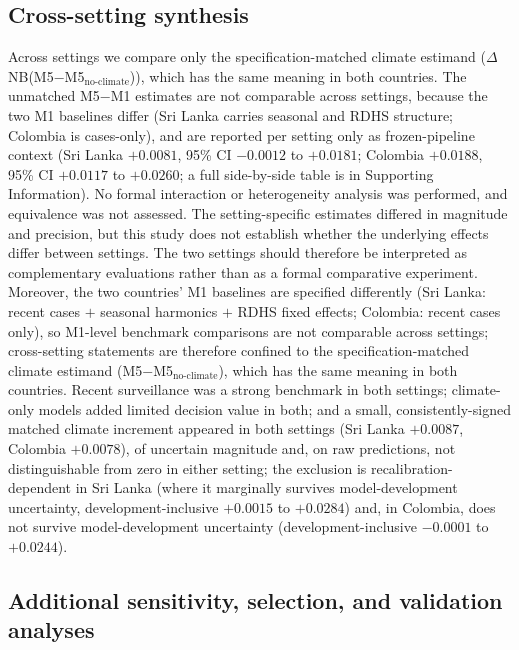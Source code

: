 \documentclass[11pt,a4paper]{article}
\begin{document}
\subsection{Cross-setting synthesis}
Across settings we compare only the specification-matched climate estimand ($\Delta$NB(M5$-$M5$_{\text{no-climate}}$)), which has the same meaning in both countries. The unmatched M5$-$M1 estimates are not comparable across settings, because the two M1 baselines differ (Sri Lanka carries seasonal and RDHS structure; Colombia is cases-only), and are reported per setting only as frozen-pipeline context (Sri Lanka $+0.0081$, 95\% CI $-0.0012$ to $+0.0181$; Colombia $+0.0188$, 95\% CI $+0.0117$ to $+0.0260$; a full side-by-side table is in Supporting Information). No formal interaction or heterogeneity analysis was performed, and equivalence was not assessed. The setting-specific estimates differed in magnitude and precision, but this study does not establish whether the underlying effects differ between settings. The two settings should therefore be interpreted as complementary evaluations rather than as a formal comparative experiment. Moreover, the two countries' M1 baselines are specified differently (Sri Lanka: recent cases $+$ seasonal harmonics $+$ RDHS fixed effects; Colombia: recent cases only), so M1-level benchmark comparisons are not comparable across settings; cross-setting statements are therefore confined to the specification-matched climate estimand (M5$-$M5$_{\text{no-climate}}$), which has the same meaning in both countries. Recent surveillance was a strong benchmark in both settings; climate-only models added limited decision value in both; and a small, consistently-signed matched climate increment appeared in both settings (Sri Lanka $+0.0087$, Colombia $+0.0078$), of uncertain magnitude and, on raw predictions, not distinguishable from zero in either setting; the exclusion is recalibration-dependent in Sri Lanka (where it marginally survives model-development uncertainty, development-inclusive $+0.0015$ to $+0.0284$) and, in Colombia, does not survive model-development uncertainty (development-inclusive $-0.0001$ to $+0.0244$).


\subsection{Additional sensitivity, selection, and validation analyses}
\end{document}
